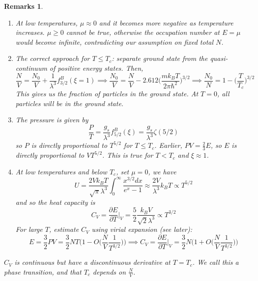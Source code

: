 \documentclass[a4paper]{article}
\newtheorem{remarks}{Remarks}[section]
\theoremstyle{new}
\begin{document}
\begin{remarks}\leavevmode
\begin{enumerate}
    \item At low temperatures, $\mu\approx 0$ and it becomes more negative as temperature increases. $\mu\geq0$ cannot be true, otherwise the occupation number at $E=\mu$ would become infinite, contradicting our assumption on fixed total $N$.
    \item The correct approach for $T\leq T_c$: separate ground state from the quasi-continuum of positive energy states. Then,
$$\frac{N}{V}=\frac{N_0}{V}+\frac{1}{\lambda^3}f_{3/2}^B(\xi=1)\implies\frac{N_0}{V}=\frac{N}{V}-2.612\bigg(\frac{mk_BT}{2\pi\hbar^2}\bigg)^{3/2}\implies\frac{N_0}{N}=1-\bigg(\frac{T}{T_c}\bigg)^{3/2}$$
This gives us the fraction of particles in the ground state. At $T=0$, all particles will be in the ground state.
\begin{center}
\end{center}
\item The pressure is given by
$$\frac{P}{T}=\frac{g_s}{\lambda^3}f_{5/2}^B(\xi)=\frac{g_s}{\lambda^3}\zeta(5/2)$$
so $P$ is directly proportional to $T^{5/2}$ for $T\leq T_c$. Earlier, $PV=\frac{2}{3}E$, so $E$ is directly proportional to $VT^{5/2}$. This is true for $T< T_c$ and $\xi\approx 1$. 
\item At low temperatures and below $T_c$, set $\mu=0$, we have
$$U=\frac{2Vk_BT}{\sqrt{\pi}\lambda^3}\int_0^\infty\frac{x^{3/2}dx}{e^x-1}\approx\frac{2V}{\lambda^3}k_BT\propto T^{5/2}$$
and so the heat capacity is
$$C_V=\frac{\partial E}{\partial T}|_V=\frac{5}{2}\frac{k_BV}{\sqrt{2}\lambda^3}\propto T^{3/2}$$
For large $T$, estimate $C_V$ using virial expansion (see later):
$$E=\frac{3}{2}PV=\frac{3}{2}NT\bigg(1-O\bigg(\frac{N}{V}\frac{1}{T^{3/2}}\bigg)\bigg)\implies C_V=\frac{\partial E}{\partial T}\bigg|_V=\frac{3}{2}N\bigg(1+O\bigg(\frac{N}{V}\frac{1}{T^{3/2}}\bigg)\bigg)$$
\begin{center}
\end{center}
\end{enumerate}
\item $C_V$ is continuous but have a discontinuous derivative at $T=T_c$. We call this a phase transition, and that $T_c$ depends on $\frac{N}{V}$.
\end{remarks}
\end{document}
